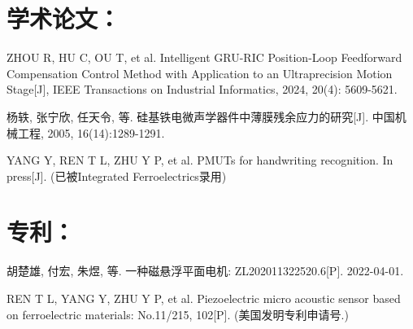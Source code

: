 \documentclass[degree=bachelor]{thuthesis}
\begin{document}
\begin{resume}
  \section*{学术论文：}

  \begin{achievements}
    \item ZHOU R, HU C, OU T, et al. Intelligent GRU-RIC Position-Loop
      Feedforward Compensation Control Method with Application to an
      Ultraprecision Motion Stage[J], IEEE Transactions on Industrial
      Informatics, 2024, 20(4): 5609-5621.

    \item 杨轶, 张宁欣, 任天令, 等. 硅基铁电微声学器件中薄膜残余应力的研究[J].
      中国机械工程, 2005, 16(14):1289-1291.

    \item YANG Y, REN T L, ZHU Y P, et al. PMUTs for handwriting recognition.
      In press[J]. (已被Integrated Ferroelectrics录用)

  \end{achievements}


  \section*{专利：}

  \begin{achievements}
    \item 胡楚雄, 付宏, 朱煜, 等. 一种磁悬浮平面电机: ZL202011322520.6[P]. 2022-04-01.

    \item REN T L, YANG Y, ZHU Y P, et al. Piezoelectric micro acoustic sensor
      based on ferroelectric materials: No.11/215, 102[P]. (美国发明专利申请号.)

  \end{achievements}
\end{resume}


\clearpage
\OMIT
\end{document}
